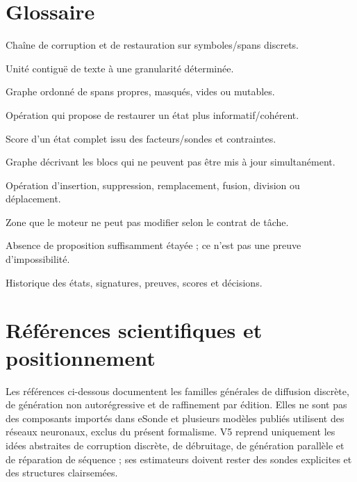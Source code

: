 \documentclass[11pt,a4paper,oneside]{report}
\begin{document}
\chapter{Glossaire}
\begin{description}[style=nextline]
\item[Diffusion discrète] Chaîne de corruption et de restauration sur symboles/spans discrets.
\item[Span] Unité contiguë de texte à une granularité déterminée.
\item[Canevas] Graphe ordonné de spans propres, masqués, vides ou mutables.
\item[Débruitage] Opération qui propose de restaurer un état plus informatif/cohérent.
\item[Énergie globale] Score d'un état complet issu des facteurs/sondes et contraintes.
\item[Graphe de conflits] Graphe décrivant les blocs qui ne peuvent pas être mis à jour simultanément.
\item[Réparation EDIT] Opération d'insertion, suppression, remplacement, fusion, division ou déplacement.
\item[LOCKED] Zone que le moteur ne peut pas modifier selon le contrat de tâche.
\item[NO-SUPPORT] Absence de proposition suffisamment étayée ; ce n'est pas une preuve d'impossibilité.
\item[Trace] Historique des états, signatures, preuves, scores et décisions.
\end{description}

\chapter{Références scientifiques et positionnement}
Les références ci-dessous documentent les familles générales de diffusion discrète, de génération non autorégressive et de raffinement par édition. Elles ne sont pas des composants importés dans eSonde et plusieurs modèles publiés utilisent des réseaux neuronaux, exclus du présent formalisme. V5 reprend uniquement les idées abstraites de corruption discrète, de débruitage, de génération parallèle et de réparation de séquence ; ses estimateurs doivent rester des sondes explicites et des structures clairsemées.
\end{document}
